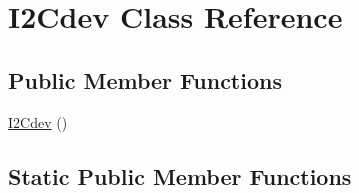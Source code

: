 \hypertarget{class_i2_cdev}{}\section{I2\+Cdev Class Reference}
\label{class_i2_cdev}
\subsection*{Public Member Functions}
\begin{DoxyCompactItemize}
\item 
\hyperlink{class_i2_cdev_a0a466e2323d9f719a1ecc9fa11ac5c84}{I2\+Cdev} ()
\end{DoxyCompactItemize}
\subsection*{Static Public Member Functions}
